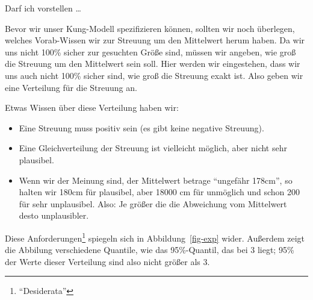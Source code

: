 \documentclass[
  a4paper,
  DIV=11]{scrreprt}
\providecommand{\tightlist}{%
  \setlength{\itemsep}{0pt}\setlength{\parskip}{0pt}}\usepackage{longtable,booktabs,array}
\theoremstyle{definition}
\theoremstyle{remark}
\begin{document}
Darf ich vorstellen \ldots{}

Bevor wir unser Kung-Modell spezifizieren können, sollten wir noch
überlegen, welches Vorab-Wissen wir zur Streuung um den Mittelwert herum
haben. Da wir uns nicht 100\% sicher zur gesuchten Größe sind, müssen
wir angeben, wie groß die Streuung um den Mittelwert sein soll. Hier
werden wir eingestehen, dass wir uns auch nicht 100\% sicher sind, wie
groß die Streuung exakt ist. Also geben wir eine Verteilung für die
Streuung an.

Etwas Wissen über diese Verteilung haben wir:

\begin{itemize}
\tightlist
\item
  Eine Streuung muss positiv sein (es gibt keine negative Streuung).
\item
  Eine Gleichverteilung der Streuung ist vielleicht möglich, aber nicht
  sehr plausibel.
\item
  Wenn wir der Meinung sind, der Mittelwert betrage ``ungefähr 178cm'',
  so halten wir 180cm für plausibel, aber 18000 cm für unmöglich und
  schon 200 für sehr unplausibel. Also: Je größer die die Abweichung vom
  Mittelwert desto unplausibler.
\end{itemize}

Diese Anforderungen\footnote{``Desiderata''} spiegeln sich in
Abbildung~\ref{fig-exp} wider. Außerdem zeigt die Abbilung verschiedene
Quantile, wie das 95\%-Quantil, das bei 3 liegt; 95\% der Werte dieser
Verteilung sind also nicht größer als 3.
\end{document}
